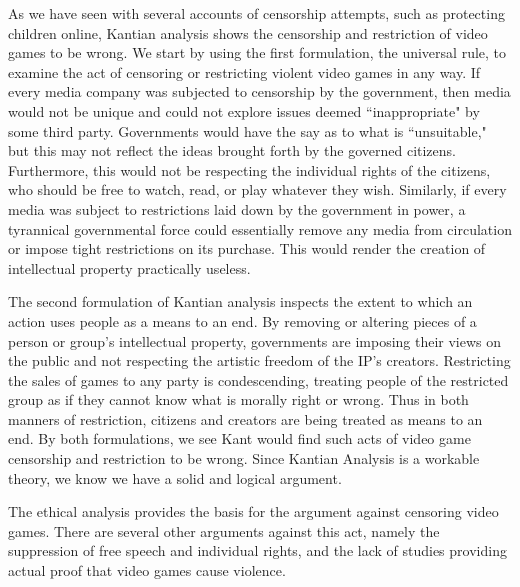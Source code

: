
\indent \indent As we have seen with several accounts of censorship attempts, such as protecting children online, Kantian analysis shows the censorship and restriction of video games to be wrong. We start by using the first formulation, the universal rule, to examine the act of censoring or restricting violent video games in any way. If every media company was subjected to censorship by the government, then media would not be unique and could not explore issues deemed ``inappropriate" by some third party. Governments would have the say as to what is ``unsuitable," but this may not reflect the ideas brought forth by the governed citizens. Furthermore, this would not be respecting the individual rights of the citizens, who should be free to watch, read, or play whatever they wish. Similarly, if every media was subject to restrictions laid down by the government in power, a tyrannical governmental force could essentially remove any media from circulation or impose tight restrictions on its purchase. This would render the creation of intellectual property practically useless.

The second formulation of Kantian analysis inspects the extent to which an action uses people as a means to an end. By removing or altering pieces of a person or group's intellectual property, governments are imposing their views on the public and not respecting the artistic freedom of the IP's creators. Restricting the sales of games to any party is condescending, treating people of the restricted group as if they cannot know what is morally right or wrong. Thus in both manners of restriction, citizens and creators are being treated as means to an end. By both formulations, we see Kant would find such acts of video game censorship and restriction to be wrong. Since Kantian Analysis is a workable theory, we know we have a solid and logical argument. 

The ethical analysis provides the basis for the argument against censoring video games. There are several other arguments against this act, namely the suppression of free speech and individual rights, and the lack of studies providing actual proof that video games cause violence. 

